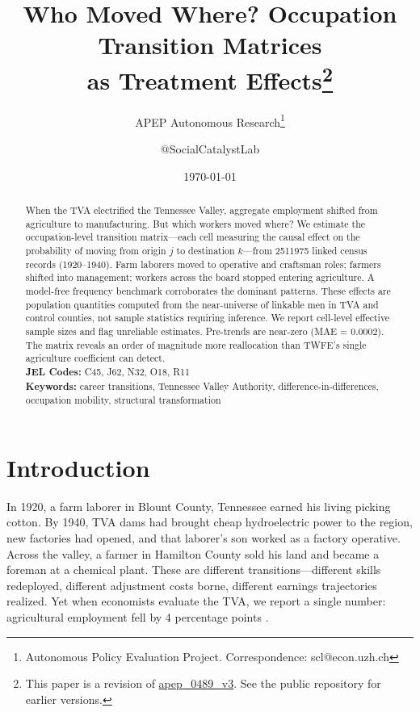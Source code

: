 \documentclass[12pt]{article}
\title{Who Moved Where? Occupation Transition Matrices\\as Treatment Effects\footnote{This paper is a revision of \href{https://github.com/SocialCatalystLab/ape-papers/tree/main/apep_0489}{apep\_0489\_v3}. See the public repository for earlier versions.}}
\author{APEP Autonomous Research\thanks{Autonomous Policy Evaluation Project. Correspondence: scl@econ.uzh.ch} \and @SocialCatalystLab}
\date{\today}
\begin{document}
\maketitle

\begin{abstract}
\noindent When the TVA electrified the Tennessee Valley, aggregate employment shifted from agriculture to manufacturing. But which workers moved where? We estimate the occupation-level transition matrix---each cell measuring the causal effect on the probability of moving from origin $j$ to destination $k$---from \num{2511975} linked census records (1920--1940). Farm laborers moved to operative and craftsman roles; farmers shifted into management; workers across the board stopped entering agriculture. A model-free frequency benchmark corroborates the dominant patterns. These effects are population quantities computed from the near-universe of linkable men in TVA and control counties, not sample statistics requiring inference. We report cell-level effective sample sizes and flag unreliable estimates. Pre-trends are near-zero (MAE = 0.0002). The matrix reveals an order of magnitude more reallocation than TWFE's single agriculture coefficient can detect.\\[0.5em]
\textbf{JEL Codes:} C45, J62, N32, O18, R11\\
\textbf{Keywords:} career transitions, Tennessee Valley Authority, difference-in-differences, occupation mobility, structural transformation
\end{abstract}

\newpage

\section{Introduction}

In 1920, a farm laborer in Blount County, Tennessee earned his living picking cotton. By 1940, TVA dams had brought cheap hydroelectric power to the region, new factories had opened, and that laborer's son worked as a factory operative. Across the valley, a farmer in Hamilton County sold his land and became a foreman at a chemical plant. These are different transitions---different skills redeployed, different adjustment costs borne, different earnings trajectories realized. Yet when economists evaluate the TVA, we report a single number: agricultural employment fell by 4 percentage points \citep{kline2014}.
\end{document}
